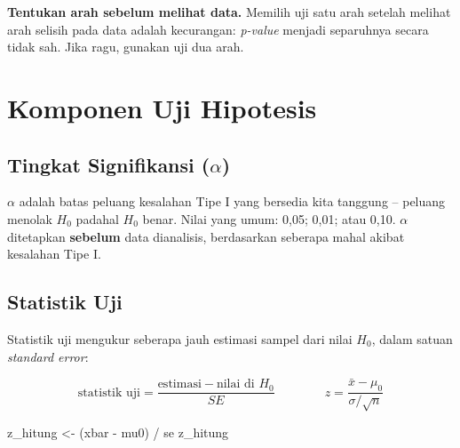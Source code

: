 \documentclass[
  indonesian,
  letterpaper,
]{book}
\newenvironment{Shaded}{\begin{snugshade}}{\end{snugshade}}
\newcommand{\NormalTok}[1]{\textcolor[rgb]{0.00,0.23,0.31}{#1}}
\newcommand{\OtherTok}[1]{\textcolor[rgb]{0.00,0.23,0.31}{#1}}
\newcommand{\SpecialCharTok}[1]{\textcolor[rgb]{0.37,0.37,0.37}{#1}}
\begin{document}
\begin{tcolorbox}[enhanced jigsaw, arc=.35mm, bottomrule=.15mm, bottomtitle=1mm, breakable, colback=white, colbacktitle=quarto-callout-warning-color!10!white, colframe=quarto-callout-warning-color-frame, coltitle=black, left=2mm, leftrule=.75mm, opacityback=0, opacitybacktitle=0.6, rightrule=.15mm, title=\textcolor{quarto-callout-warning-color}{\faExclamationTriangle}\hspace{0.5em}{Peringatan}, titlerule=0mm, toprule=.15mm, toptitle=1mm]

\textbf{Tentukan arah sebelum melihat data.} Memilih uji satu arah
setelah melihat arah selisih pada data adalah kecurangan: \emph{p-value}
menjadi separuhnya secara tidak sah. Jika ragu, gunakan uji dua arah.

\end{tcolorbox}

\section{Komponen Uji Hipotesis}\label{komponen-uji-hipotesis}

\subsection{\texorpdfstring{Tingkat Signifikansi
(\(\alpha\))}{Tingkat Signifikansi (\textbackslash alpha)}}\label{tingkat-signifikansi-alpha}

\(\alpha\) adalah batas peluang kesalahan Tipe I yang bersedia kita
tanggung -- peluang menolak \(H_0\) padahal \(H_0\) benar. Nilai yang
umum: 0,05; 0,01; atau 0,10. \(\alpha\) ditetapkan \textbf{sebelum} data
dianalisis, berdasarkan seberapa mahal akibat kesalahan Tipe I.

\subsection{Statistik Uji}\label{statistik-uji}

Statistik uji mengukur seberapa jauh estimasi sampel dari nilai \(H_0\),
dalam satuan \emph{standard error}:

\[
\text{statistik uji} = \frac{\text{estimasi} - \text{nilai di } H_0}{SE}
\qquad\qquad
z = \frac{\bar{x} - \mu_0}{\sigma / \sqrt{n}}
\]

\begin{Shaded}
\begin{Highlighting}[]
\NormalTok{z\_hitung }\OtherTok{\textless{}{-}}\NormalTok{ (xbar }\SpecialCharTok{{-}}\NormalTok{ mu0) }\SpecialCharTok{/}\NormalTok{ se}
\NormalTok{z\_hitung}
\end{Highlighting}
\end{Shaded}
\end{document}
